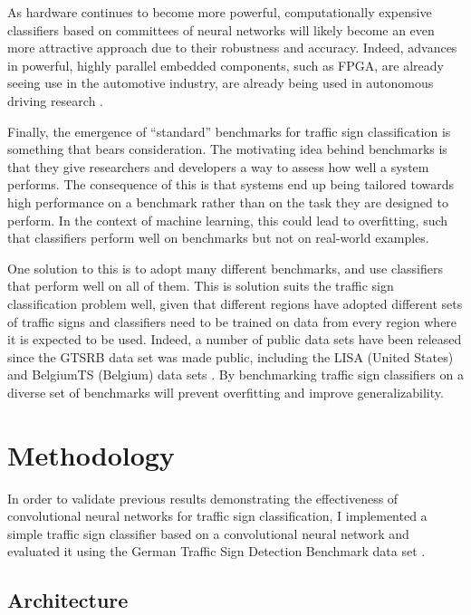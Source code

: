 \documentclass[letterpaper,twocolumn,10pt]{article}
\begin{document}
As hardware continues to become more powerful, computationally expensive classifiers based on committees of neural networks will likely become an even more attractive approach due to their robustness and accuracy. Indeed, advances in powerful, highly parallel embedded components, such as FPGA, are already seeing use in the automotive industry, are already being used in autonomous driving research \cite{fpga, fpga2}.

Finally, the emergence of ``standard'' benchmarks for traffic sign classification is something that bears consideration. The motivating idea behind benchmarks is that they give researchers and developers a way to assess how well a system performs. The consequence of this is that systems end up being tailored towards high performance on a benchmark rather than on the task they are designed to perform. In the context of machine learning, this could lead to overfitting, such that classifiers perform well on benchmarks but not on real-world examples.

One solution to this is to adopt many different benchmarks, and use classifiers that perform well on all of them. This is solution suits the traffic sign classification problem well, given that different regions have adopted different sets of traffic signs and classifiers need to be trained on data from every region where it is expected to be used. Indeed, a number of public data sets have been released since the GTSRB data set was made public, including the LISA (United States) and BelgiumTS (Belgium) data sets \cite{mathias_traffic_2013, mogelmose_vision-based_2012}. By benchmarking traffic sign classifiers on a diverse set of benchmarks will prevent overfitting and improve generalizability. 




\section{Methodology}

In order to validate previous results demonstrating the effectiveness of convolutional neural networks for traffic sign classification, I implemented a simple traffic sign classifier based on a convolutional neural network and evaluated it using the German Traffic Sign Detection Benchmark data set \cite{stallkamp_german_2011, stallkamp_man_2012}. 

\subsection{Architecture}
\end{document}
